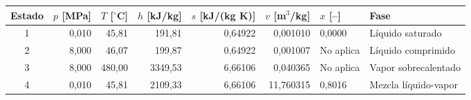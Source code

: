 \begin{tabular}{crrrrrlp{}}
\toprule
Estado & $p$ [MPa] & $T$ [$^\circ$C] & $h$ [kJ/kg] & $s$ [kJ/(kg K)] & $v$ [m$^3$/kg] & $x$ [--] & Fase\\
\midrule
1 & 0,010 & 45,81 & 191,81 & 0,64922 & 0,001010 & 0,0000 & Líquido saturado \\
2 & 8,000 & 46,07 & 199,87 & 0,64922 & 0,001007 & No aplica & Líquido comprimido \\
3 & 8,000 & 480,00 & 3349,53 & 6,66106 & 0,040365 & No aplica & Vapor sobrecalentado \\
4 & 0,010 & 45,81 & 2109,33 & 6,66106 & 11,760315 & 0,8016 & Mezcla líquido-vapor \\
\bottomrule
\end{tabular}
